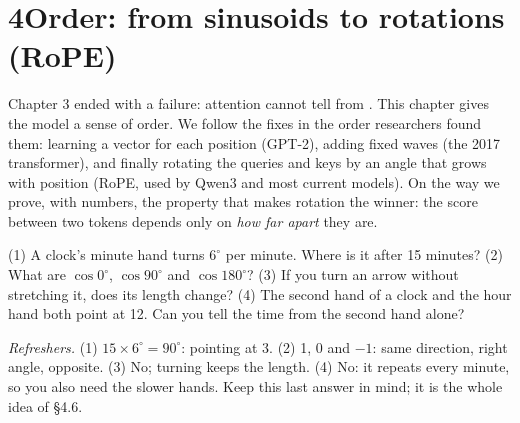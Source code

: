\newpage
\section*{4\quad Order: from sinusoids to rotations (RoPE)}
\ifdefined\fitwidthFourFive\else
\newsavebox{\fitboxFourFive}
\newcommand{\fitwidthFourFive}[1]{\sbox{\fitboxFourFive}{\begin{tabular}{@{}c@{}}#1\end{tabular}}\ifdim\wd\fitboxFourFive>\linewidth\resizebox{\linewidth}{!}{\usebox{\fitboxFourFive}}\else\usebox{\fitboxFourFive}\fi}
\fi

\begin{chaptermap}
Chapter 3 ended with a failure: attention cannot tell  from . This
chapter gives the model a sense of order. We follow the fixes in the order researchers found them:
learning a vector for each position (GPT-2), adding fixed waves (the 2017 transformer), and finally
rotating the queries and keys by an angle that grows with position (RoPE, used by Qwen3 and most current
models). On the way we prove, with numbers, the property that makes rotation the winner: the score
between two tokens depends only on \emph{how far apart} they are.
\end{chaptermap}


\begin{beforeyoustart}
(1) A clock's minute hand turns $6^\circ$ per minute. Where is it after 15 minutes?
(2) What are $\cos 0^\circ$, $\cos 90^\circ$ and $\cos 180^\circ$? (3) If you turn an arrow without
stretching it, does its length change? (4) The second hand of a clock and the hour hand both point at
12. Can you tell the time from the second hand alone?

\smallskip\noindent\textit{Refreshers.} (1) $15\times6^\circ = 90^\circ$: pointing at 3. (2) 1, 0 and
$-1$: same direction, right angle, opposite. (3) No; turning keeps the length. (4) No: it repeats every
minute, so you also need the slower hands. Keep this last answer in mind; it is the whole idea of
\S4.6.
\end{beforeyoustart}

